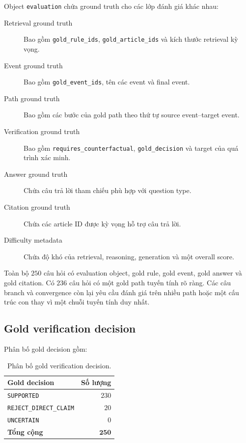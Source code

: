 Object \texttt{evaluation} chứa ground truth cho các lớp đánh giá khác nhau:

\begin{description}
    \item[Retrieval ground truth]
    Bao gồm \texttt{gold\_rule\_ids},
    \texttt{gold\_article\_ids} và kích thước retrieval kỳ vọng.

    \item[Event ground truth]
    Bao gồm \texttt{gold\_event\_ids}, tên các event và final event.

    \item[Path ground truth]
    Bao gồm các bước của gold path theo thứ tự
    source event--target event.

    \item[Verification ground truth]
    Bao gồm \texttt{requires\_counterfactual},
    \texttt{gold\_decision} và target của quá trình xác minh.

    \item[Answer ground truth]
    Chứa câu trả lời tham chiếu phù hợp với question type.

    \item[Citation ground truth]
    Chứa các article ID được kỳ vọng hỗ trợ câu trả lời.

    \item[Difficulty metadata]
    Chứa độ khó của retrieval, reasoning, generation và một overall score.
\end{description}

Toàn bộ \(250\) câu hỏi có evaluation object, gold rule, gold event, gold
answer và gold citation. Có \(236\) câu hỏi có một gold path tuyến tính rõ
ràng. Các câu branch và convergence còn lại yêu cầu đánh giá trên nhiều path
hoặc một cấu trúc con thay vì một chuỗi tuyến tính duy nhất.

\subsection{Gold verification decision}

Phân bố gold decision gồm:

\begin{table}[t]
    \centering
    \caption{Phân bố gold verification decision.}
    \label{tab:gold-decision}
    \begin{tabular}{lr}
        \hline
        \textbf{Gold decision} & \textbf{Số lượng} \\
        \hline
        \texttt{SUPPORTED} & \(230\) \\
        \texttt{REJECT\_DIRECT\_CLAIM} & \(20\) \\
        \texttt{UNCERTAIN} & \(0\) \\
        \hline
        \textbf{Tổng cộng} & \(\mathbf{250}\) \\
        \hline
    \end{tabular}
\end{table}

